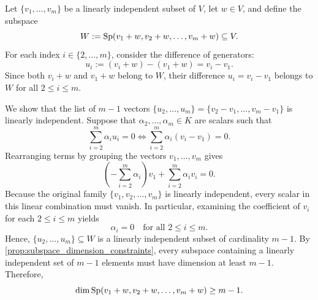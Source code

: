\begin{exercisesolution}
\label{sol:shifted_span_dimension}
Let $\{v_1, \dots, v_m\}$ be a linearly independent subset of $V$, let $w \in V$, and define the subspace
\[
    W := \operatorname{Sp}(v_1 + w, v_2 + w, \dots, v_m + w) \subseteq V.
\]
For each index $i \in \{2, \dots, m\}$, consider the difference of generators:
\[
    u_i := (v_i + w) - (v_1 + w) = v_i - v_1.
\]
Since both $v_i + w$ and $v_1 + w$ belong to $W$, their difference $u_i = v_i - v_1$ belongs to $W$ for all $2 \le i \le m$.

We show that the list of $m - 1$ vectors $\{u_2, \dots, u_m\} = \{v_2 - v_1, \dots, v_m - v_1\}$ is linearly independent. Suppose that $\alpha_2, \dots, \alpha_m \in K$ are scalars such that
\[
    \sum_{i=2}^m \alpha_i u_i = 0 \iff \sum_{i=2}^m \alpha_i (v_i - v_1) = 0.
\]
Rearranging terms by grouping the vectors $v_1, \dots, v_m$ gives
\[
    \left( -\sum_{i=2}^m \alpha_i \right) v_1 + \sum_{i=2}^m \alpha_i v_i = 0.
\]
Because the original family $\{v_1, v_2, \dots, v_m\}$ is linearly independent, every scalar in this linear combination must vanish. In particular, examining the coefficient of $v_i$ for each $2 \le i \le m$ yields
\[
    \alpha_i = 0 \quad \text{for all } 2 \le i \le m.
\]
Hence, $\{u_2, \dots, u_m\} \subseteq W$ is a linearly independent subset of cardinality $m - 1$. By \cref{prop:subspace_dimension_constraints}, every subspace containing a linearly independent set of $m - 1$ elements must have dimension at least $m - 1$. Therefore,
\[
    \dim \operatorname{Sp}(v_1 + w, v_2 + w, \dots, v_m + w) \ge m - 1.
\]
\end{exercisesolution}

